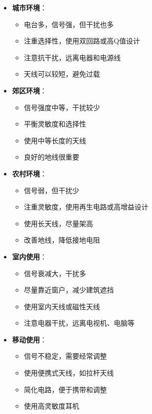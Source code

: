 \documentclass[12pt,UTF8]{ctexbook}
\begin{document}
\begin{itemize}[leftmargin=3.5em]
    \item \textbf{城市环境}：
        \begin{itemize}[leftmargin=3.5em]
            \item 电台多，信号强，但干扰也多
            \item 注重选择性，使用双回路或高Q值设计
            \item 注意抗干扰，远离电器和电源线
            \item 天线可以较短，避免过载
        \end{itemize}
    \item \textbf{郊区环境}：
        \begin{itemize}[leftmargin=3.5em]
            \item 信号强度中等，干扰较少
            \item 平衡灵敏度和选择性
            \item 使用中等长度的天线
            \item 良好的地线很重要
        \end{itemize}
    \item \textbf{农村环境}：
        \begin{itemize}[leftmargin=3.5em]
            \item 信号弱，但干扰少
            \item 注重灵敏度，使用再生电路或高增益设计
            \item 使用长天线，尽量架高
            \item 改善地线，降低接地电阻
        \end{itemize}
    \item \textbf{室内使用}：
        \begin{itemize}[leftmargin=3.5em]
            \item 信号衰减大，干扰多
            \item 尽量靠近窗户，减少建筑遮挡
            \item 使用室内天线或磁性天线
            \item 注意电器干扰，远离电视机、电脑等
        \end{itemize}
    \item \textbf{移动使用}：
        \begin{itemize}[leftmargin=3.5em]
            \item 信号不稳定，需要经常调整
            \item 使用便携式天线，如拉杆天线
            \item 简化电路，便于携带和调整
            \item 使用高灵敏度耳机
        \end{itemize}
\end{itemize}
\end{document}

